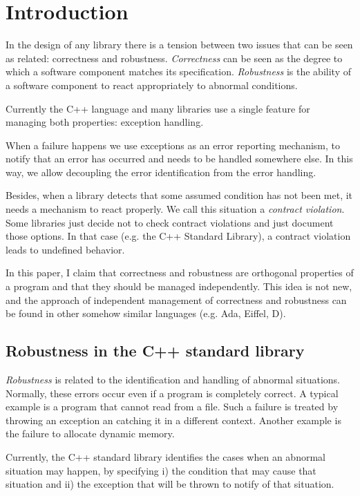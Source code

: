 \section{Introduction}

In the design of any library there is a tension between two issues that can be
seen as related: correctness and robustness.  \emph{Correctness} can be seen as
the degree to which a software component matches its specification.
\emph{Robustness} is the ability of a software component to react appropriately
to abnormal conditions.

Currently the C++ language and many libraries use a single feature for managing both
properties: exception handling. 

When a failure happens we use exceptions as an error reporting mechanism, to
notify that an error has occurred and needs to be handled somewhere else. In
this way, we allow decoupling the error identification from the error handling.

Besides, when a library detects that some assumed condition has not been met, it
needs a mechanism to react properly. We call this situation a \emph{contract
violation}. Some libraries just decide not to check contract violations and just
document those options. In that case (e.g. the C++ Standard Library), a contract
violation leads to undefined behavior.

In this paper, I claim that correctness and robustness are orthogonal properties
of a program and that they should be managed independently. This idea is not new, and
the approach of independent management of correctness and robustness can be
found in other somehow similar languages (e.g.  Ada, Eiffel, D).

\subsection{Robustness in the C++ standard library}

\emph{Robustness} is related to the identification and handling of abnormal
situations. Normally, these errors occur even if a program is completely
correct. A typical example is a program that cannot read from a file. Such a
failure is treated by throwing an exception an catching it in a different
context. Another example is the failure to allocate dynamic memory.

Currently, the C++ standard library identifies the cases when an abnormal
situation may happen, by specifying i) the condition that may cause that situation
and ii) the exception that will be thrown to notify of that situation.

